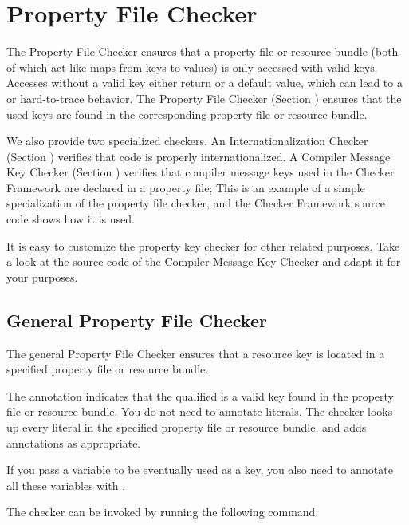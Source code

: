 \htmlhr
\chapter{Property File Checker\label{propkey-checker}}

The Property File Checker ensures that a property file or resource bundle (both
of which act like maps from keys to values) is only accessed with valid keys.
Accesses without a valid key either return  or a default value, which
can lead to a  or hard-to-trace behavior.
The Property File Checker (Section ) ensures
that the used keys are found in the corresponding property file or resource
bundle.

We also provide two specialized checkers.
An Internationalization Checker (Section )
verifies that code is properly internationalized.
A Compiler Message Key Checker (Section )
verifies that compiler message keys used in the Checker Framework are
declared in a property file;
This is an example of a simple specialization of the property
file checker, and the Checker Framework source code shows how it is used.

It is easy to customize the property key checker for other related purposes.
Take a look at the source code of the Compiler Message Key Checker and adapt it for
your purposes.



\section{General Property File Checker\label{genpropkey-checker}}

The general Property File Checker ensures that a resource key is located
in a specified property file or resource bundle.


The annotation 
indicates that the qualified  is a valid key
found in the property file or resource bundle.
You do not need to annotate  literals.
The checker looks up every  literal in the specified
property file or resource bundle, and adds annotations as appropriate.

If you pass a  variable to be eventually used as a key, you
also need to annotate all these variables with .


The checker can be invoked by running the following
command:

